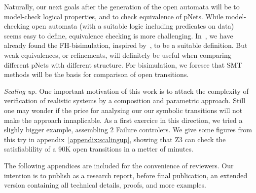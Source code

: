 \documentclass{lncs/llncs}
\newcommand{\todoMargin}[2][color=red!60, size=\tiny]{\todo[#1]{{\bf
      ToDo: } {#2}}}
\begin{document}
%
Naturally, our next goals after the generation of the open automata
will be to model-check logical properties, and to check equivalence of pNets. While
model-checking open automata (with a suitable logic including
predicates on data) seems easy to define, equivalence checking is more challenging.
In~\cite{henrio:Forte2016}, we
have already found the FH-bisimulation, inspired by~\cite{deSimone85}, to be a
suitable definition. But weak equivalences, or refinements, will
definitely be useful when comparing different pNets with
different structure. For bisimulation, we foresee that SMT methods
will be the basis for comparison of open transitions. 

\emph{Scaling up.} One important motivation of this work is to
attack the complexity of verification of realistic systems by a
composition and parametric approach. Still one may wonder if the price
for analysing our our symbolic transitions will not make the approach
innaplicable. As a first exercice in this direction, we tried a
slighly bigger example, assembling 2 Failure controlers. We give some
figures from this try in appendix~\ref{appendix:scalingup}, showing that Z3 can check the
satisfiablility of a 90K open transitions in a metter of minutes.




% 


\newpage
\appendix
The following appendices are included for the convenience of reviewers.
Our intention is to publish as a research report, before final publication, an
extended version containing all technical details, proofs, and more examples.
\end{document}
